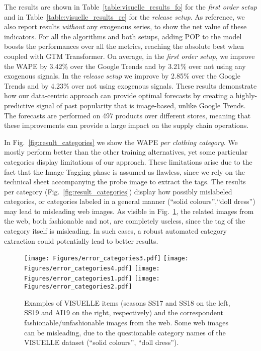 \documentclass[runningheads]{llncs}
\newcommand{\snamebig}[0] {POP\xspace}
\begin{document}
The results are shown in Table~\ref{table:visuelle_results_fo} for the \emph{first order setup} and in Table~\ref{table:visuelle_results_re} for the \emph{release setup}. As reference, we also report results \emph{without} any exogenous series, to show the net value of these indicators. For all the algorithms and both setups, adding \snamebig to the model boosts the performances over all the metrics, reaching the absolute best when coupled with GTM Transformer. On average, in the \emph{first order setup}, we improve the WAPE by 3.42\% over the Google Trends and by 3.21\% over not using any exogenous signals. In the \emph{release setup}  we improve by 2.85\% over the Google Trends and by 4.23\% over not using exogenous signals. These results demonstrate how our data-centric approach can provide optimal forecasts by creating a highly-predictive signal of past popularity that is image-based, unlike Google Trends. The forecasts are performed on 497 products over different stores, meaning that these improvements can provide a large impact on the supply chain operations. 


In Fig.~\ref{fig:result_categories} we show the WAPE \emph{per clothing category}. We mostly perform better than the other training alternatives, yet some particular categories display limitations of our approach. These limitations arise due to the fact that the Image Tagging phase is assumed as flawless, since we rely on the technical sheet accompanying the probe image to extract the tags. The results per category (Fig.~\ref{fig:result_categories}) display how possibly mislabeled categories, or categories labeled in a general manner (``solid colours'',``doll dress'') may lead to misleading web images. As visible in Fig.~\ref{fig:pop_images_examples}, the related images from the web, both fashionable and not, are completely useless, since the tag of the category itself is misleading. In such cases, a robust automated category extraction could potentially lead to better results.



\begin{figure}
    \centering
\texttt{[image: Figures/error\_categories3.pdf]}
    \texttt{[image: Figures/error\_categories4.pdf]}
    \texttt{[image: Figures/error\_categories1.pdf]}
    \texttt{[image: Figures/error\_categories2.pdf]}
    \caption{\footnotesize \label{fig:pop_images_examples}Examples of VISUELLE items (seasons SS17 and SS18 on the left, SS19 and AI19 on the right, respectively) and the correspondent fashionable/unfashionable images from the web. Some web images can be misleading, due to the questionable category names of the VISUELLE dataset (``solid colours'', ``doll dress'').}
    \vspace{-1cm}
\end{figure}
\end{document}
